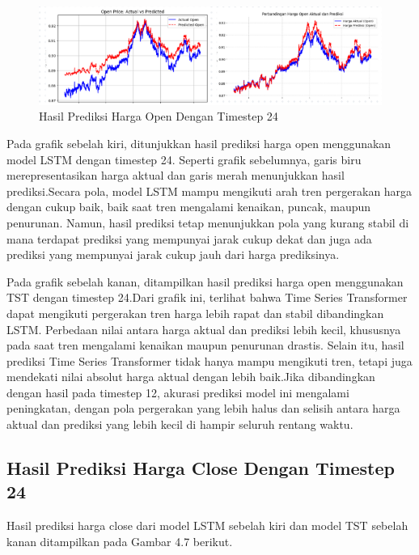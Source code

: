 \begin{figure} [H] \centering
    \includegraphics[scale=1.3]{gambar/perbandingan open(24).png} 
    \caption{Hasil Prediksi Harga Open Dengan Timestep 24}
    \label{fig:label_gambar}
\end{figure}

Pada grafik sebelah kiri, ditunjukkan hasil prediksi harga open menggunakan model LSTM dengan timestep 24. Seperti grafik sebelumnya, garis biru merepresentasikan harga aktual dan garis merah menunjukkan hasil prediksi.Secara pola, model LSTM mampu mengikuti arah tren pergerakan harga dengan cukup baik, baik saat tren mengalami kenaikan, puncak, maupun penurunan. Namun, hasil prediksi tetap menunjukkan pola yang kurang stabil di mana terdapat prediksi yang mempunyai jarak cukup dekat dan juga ada prediksi yang mempunyai jarak cukup jauh dari harga prediksinya.

Pada grafik sebelah kanan, ditampilkan hasil prediksi harga open menggunakan TST dengan timestep 24.Dari grafik ini, terlihat bahwa Time Series Transformer dapat mengikuti pergerakan tren harga lebih rapat dan stabil dibandingkan LSTM. Perbedaan nilai antara harga aktual dan prediksi lebih kecil, khususnya pada saat tren mengalami kenaikan maupun penurunan drastis. Selain itu, hasil prediksi Time Series Transformer tidak hanya mampu mengikuti tren, tetapi juga mendekati nilai absolut harga aktual dengan lebih baik.Jika dibandingkan dengan hasil pada timestep 12, akurasi prediksi model ini mengalami peningkatan, dengan pola pergerakan yang lebih halus dan selisih antara harga aktual dan prediksi yang lebih kecil di hampir seluruh rentang waktu.

\subsection{Hasil Prediksi Harga Close Dengan Timestep 24}
Hasil prediksi harga close dari model LSTM sebelah kiri dan model TST sebelah kanan ditampilkan pada Gambar 4.7 berikut.

